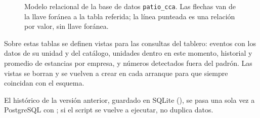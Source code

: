 \begin{figure}[htbp]
{%
  }
  \caption{Modelo relacional de la base de datos \texttt{patio\_cca}. Las
           flechas van de la llave foránea a la tabla referida; la línea
           punteada es una relación por valor, sin llave foránea.}
  \label{fig:bd}
\end{figure}

Sobre estas tablas se definen vistas para las consultas del tablero:
eventos con los datos de su unidad y del catálogo, unidades dentro en este
momento, historial y promedio de estancias por empresa, y números
detectados fuera del padrón. Las vistas se borran y se vuelven a crear en
cada arranque para que siempre coincidan con el esquema.

El histórico de la versión anterior, guardado en SQLite
(), se pasa una sola vez a PostgreSQL con
; si el script se vuelve a
ejecutar, no duplica datos.
